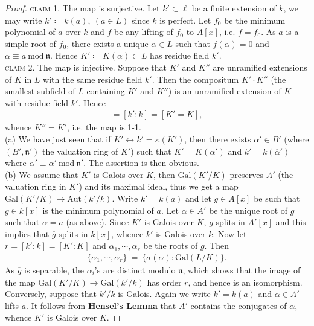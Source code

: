 \documentclass[12pt,a4paper,footinclude=true,headinclude=true]{scrbook} %
\begin{document}
\begin{proof}
    \textsc{claim 1.} The map is surjective. Let $k'\subset\ell$ be a finite extension of $k$, we may write $k'\coloneqq k(a),\ (a\in L)$ since $k$ is perfect. Let $f_0$ be the minimum polynomial of $a$ over $k$ and $f$ be any lifting of $f_0$ to $A[x]$, i.e. $\overline{f}=f_0$. As $a$ is a simple root of $f_0$, there exists a unique $\alpha\in L$ such that $f(\alpha)=0$ and $\alpha\equiv a\ \mathrm{mod}\ \mathfrak{n}$. Hence $K'\coloneqq K(\alpha)\subset L$ has residue field $k'$.\\
    \textsc{claim 2.} The map is injective. Suppose that $K'$ and $K''$ are unramified extensions of $K$ in $L$ with the same residue field $k'$. Then the compositum $K'\cdot K''$ (the smallest subfield of $L$ containing $K'$ and $K''$) is an unramified extension of $K$ with residue field $k'$. Hence
    \begin{align*}
        [K'\cdot K'':K]=[k':k]=[K'=K],
    \end{align*}
    whence $K''=K'$, i.e. the map is 1-1.\\
    (a) We have just seen that if $K'\leftrightarrow k'=\kappa(K')$, then there exists $\alpha'\in B'$ (where $(B',\mathfrak{n}')$ the valuation ring of $K'$) such that $K'=K(\alpha')$ and $k'=k(\overline{\alpha}')$ where $\overline{\alpha}'\equiv\alpha'\ \mathrm{mod}\ \mathfrak{n}'$. The assertion is then obvious. \\
    (b) We assume that $K'$ is Galois over $K$, then $\mathrm{Gal}(K'/K)$ preserves $A'$ (the valuation ring in $K'$) and its maximal ideal, thus we get a map $\mathrm{Gal}(K'/K)\to\mathrm{Aut}(k'/k)$. Write $k'=k(a)$ and let $g\in A[x]$ be such that $\overline{g}\in k[x]$ is the minimum polynomial of $a$. Let $\alpha\in A'$ be the unique root of $g$ such that $\overline{\alpha}=a$ (as above). Since $K'$ is Galois over $K$, $g$ splits in $A'[x]$ and this implies that $\overline{g}$ splits in $k[x]$, whence $k'$ is Galois over $k$. Now let $r=[k':k]=[K':K]$ and $\alpha_1,\cdots,\alpha_r$ be the roots of $g$. Then 
    \begin{align*}
        \{\alpha_1,\cdots,\alpha_r\}\ =\ \{\sigma(\alpha):\mathrm{Gal}(L/K)\}.
    \end{align*}
    As $\overline{g}$ is separable, the $\alpha_i$'s are distinct modulo $\mathfrak{n}$, which shows that the image of the map $\mathrm{Gal}(K'/K)\to\mathrm{Gal}(k'/k)$ has order $r$, and hence is an isomorphism. Conversely, suppose that $k'/k$ is Galois. Again we write $k'=k(a)$ and $\alpha\in A'$ lifts $a$. It follows from \textbf{Hensel's Lemma} that $A'$ contains the conjugates of $\alpha$, whence $K'$ is Galois over $K$.
\end{proof}
\end{document}
